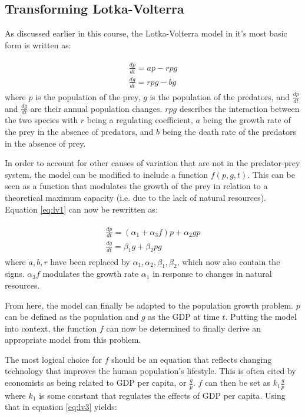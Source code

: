 \documentclass[a4paper]{article}
\begin{document}
\subsection{Transforming Lotka-Volterra}

As discussed earlier in this course, the Lotka-Volterra model in it's most basic form is written as:

\begin{align}
\begin{split}
\label{eq:lv1}
	\frac{dp}{dt} = ap - rpg \\
	\frac{dg}{dt} = rpg - bg
\end{split}
\end{align}
where $p$ is the population of the prey, $g$ is the population of the predators, and $\frac{dp}{dt}$ and $\frac{dg}{dt}$ are their annual population changes. $rpg$ describes the interaction between the two species with $r$ being a regulating coefficient, $a$ being the growth rate of the prey in the absence of predators, and $b$ being the death rate of the predators in the absence of prey. 

In order to account for other causes of variation that are not in the predator-prey system, the model can be modified to include a function $f(p, g, t)$. This can be seen as a function that modulates the growth of the prey in relation to a theoretical maximum capacity (i.e. due to the lack of natural resources). Equation \ref{eq:lv1} can now be rewritten as:

\begin{align}
\begin{split}
\label{eq:lv3}
	\frac{dp}{dt} = (\alpha_1 + \alpha_3 f)p + \alpha_2 g p \\
	\frac{dg}{dt} = \beta_1 g + \beta_2 p g
\end{split}
\end{align}
where $a, b, r$ have been replaced by $\alpha_1, \alpha_2, \beta_1, \beta_2$, which now also contain the signs. $\alpha_3f$ modulates the growth rate $\alpha_1$ in response to changes in natural resources.

From here, the model can finally be adapted to the population growth problem. $p$ can be defined as the population and $g$ as the GDP at time $t$. Putting the model into context, the function $f$ can now be determined to finally derive an appropriate model from this problem.

The most logical choice for $f$ should be an equation that reflects changing technology that improves the human population's lifestyle. This is often cited by economists as being related to GDP per capita, or $\frac{g}{p}$. $f$ can then be set as $k_1 \frac{g}{p}$ where $k_1$ is some constant that regulates the effects of GDP per capita. Using that in equation \ref{eq:lv3} yields:
\end{document}
